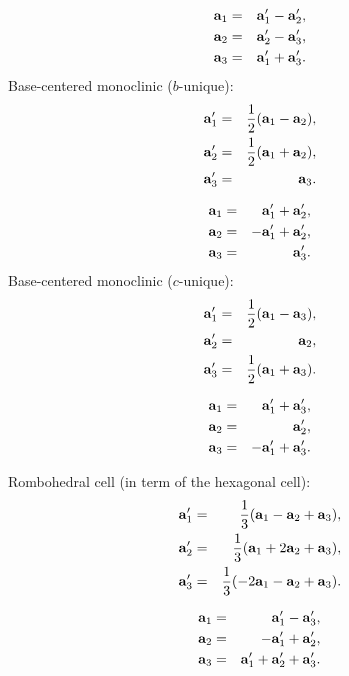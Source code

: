 \documentclass[12pt,a4paper,twoside]{report}
\begin{document}
\begin{eqnarray}
{\bf a}_1&=&  {\bf a}_1' - {\bf a}_2', \\
{\bf a}_2&=&  {\bf a}_2' - {\bf a}_3', \\
{\bf a}_3&=& {\bf a}_1' + {\bf a}_3'.
\end{eqnarray}
Base-centered monoclinic ($b$-unique):
\begin{eqnarray}
{\bf a}_1'&=&{1\over 2} ({\bf a}_1 - {\bf a}_2), \\
{\bf a}_2'&=&{1\over 2} ({\bf a}_1 + {\bf a}_2), \\
{\bf a}_3'&=&{\bf a}_3. 
\end{eqnarray}

\begin{eqnarray}
{\bf a}_1&=&  {\bf a}_1' + {\bf a}_2', \\
{\bf a}_2&=& -{\bf a}_1' + {\bf a}_2', \\
{\bf a}_3&=& {\bf a}_3'.
\end{eqnarray}
Base-centered monoclinic ($c$-unique):
\begin{eqnarray}
{\bf a}_1'&=&{1\over 2} ({\bf a}_1 - {\bf a}_3), \\
{\bf a}_2'&=&{\bf a}_2, \\
{\bf a}_3'&=&{1\over 2} ({\bf a}_1 + {\bf a}_3). 
\end{eqnarray}

\begin{eqnarray}
{\bf a}_1&=& {\bf a}_1' + {\bf a}_3', \\
{\bf a}_2&=& {\bf a}_2', \\
{\bf a}_3&=& -{\bf a}_1' + {\bf a}_3'.
\end{eqnarray}

Rombohedral cell (in term of the hexagonal cell):
\begin{eqnarray}
{\bf a}_1'&=&{1\over 3} ({\bf a}_1 - {\bf a}_2 + {\bf a}_3), \\
{\bf a}_2'&=&{1\over 3} ({\bf a}_1 + 2 {\bf a}_2 + {\bf a}_3), \\
{\bf a}_3'&=&{1\over 3} (-2 {\bf a}_1 - {\bf a}_2 + {\bf a}_3). 
\end{eqnarray}

\begin{eqnarray}
{\bf a}_1&=& {\bf a}_1' - {\bf a}_3', \\
{\bf a}_2&=& - {\bf a}_1' + {\bf a}_2', \\
{\bf a}_3&=& {\bf a}_1' + {\bf a}_2' + {\bf a}_3'.
\end{eqnarray}
\end{document}

